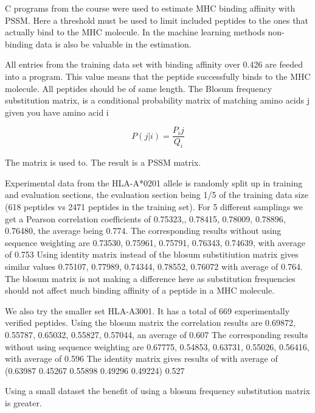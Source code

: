 
C programs from the course were used to estimate MHC binding affinity with PSSM.
Here a threshold must be used to limit included peptides to the ones that actually bind to the MHC molecule. 
In the machine learning methods non-binding data is also be valuable in the estimation.

All entries from the training data set with binding affinity over 0.426 are feeded into a program. 
This value means that the peptide successfully binds to the MHC molecule. All peptides should be of same length.
The Blosum frequency substitution matrix, is a
conditional probability matrix of matching amino
acids j given you have amino acid i

\begin{equation}
P(j|i) = \frac{P_ij}{Q_i}
\end{equation}

The matrix is used to. The result is a PSSM matrix. 

Experimental data from the HLA-A*0201 allele is randomly split up in training and evaluation sections, the evaluation section being 1/5 of the training data size (618 peptides vs 2471 peptides in the training set).
For 5 different samplings we get a Pearson correlation coefficients of {0.75323,, 0.78415, 0.78009, 0.78896, 0.76480}, the average being 0.774.
The corresponding results without using sequence weighting are {0.73530, 0.75961, 0.75791, 0.76343, 0.74639}, with average of 0.753
Using identity matrix instead of the blosum substitiution matrix gives similar values {0.75107, 0.77989, 0.74344, 0.78552, 0.76072} with average of 0.764.
The blosum matrix is not making a difference here as substitution frequencies should not affect much binding affinity of a peptide in a MHC molecule.

We also try the smaller set HLA-A3001. It has a total of 669 experimentally verified peptides.
Using the blosum matrix the correlation results are {0.69872, 0.55787, 0.65032, 0.55827, 0.57044}, an average of 0.607
The corresponding results without using sequence weighting are {0.67775, 0.54853, 0.63731, 0.55026, 0.56416}, with average of 0.596
The identity matrix gives results of with average of (0.63987 0.45267 0.55898 0.49296 0.49224) 0.527 

Using a small dataset the benefit of using a blosum frequency substitution matrix is greater.


